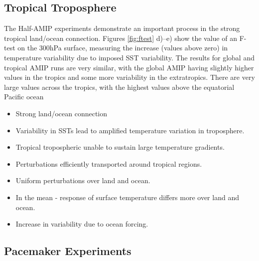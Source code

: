 \subsection{Tropical Troposphere}
The Half-AMIP experiments demonstrate an important process in the strong 
tropical land/ocean connection. Figures \ref{fig:ftest} d)--e) show the value of 
an F-test on the 300hPa surface, measuring the increase (values above zero) in 
temperature variability due to imposed SST variability. The results for global 
and tropical AMIP runs are very similar, with the global AMIP having slightly 
higher values in the tropics and some more variability in the extratropics.  
There are very large values across the tropics, with the highest values above 
the equatorial Pacific ocean

\begin{itemize}
	\item Strong land/ocean connection
	\item Variability in SSTs lead to amplified temperature variation in 
		troposphere.
	\item Tropical tropospheric unable to sustain large temperature gradients.
	\item Perturbations efficiently transported around tropical regions.
	\item Uniform perturbations over land and ocean.
	\item In the mean - response of surface temperature differs more over land 
		and ocean.
	\item Increase in variability due to ocean forcing.
\end{itemize}


\subsection{Pacemaker Experiments}



